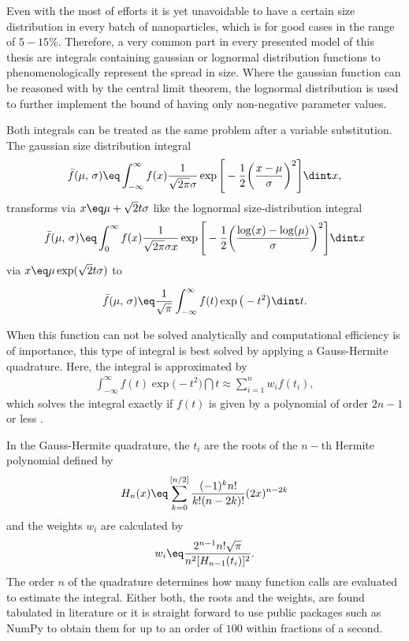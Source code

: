 \documentclass[\main/dresen_thesis.tex]{subfiles}
\begin{document}
  Even with the most of efforts it is yet unavoidable to have a certain size distribution in every batch of nanoparticles, which is for good cases in the range of $5 - 15 \%$.
  Therefore, a very common part in every presented model of this thesis are integrals containing gaussian or lognormal  distribution functions to phenomenologically represent the spread in size.
  Where the gaussian function can be reasoned with by the central limit theorem, the lognormal distribution is used to further implement the bound of having only non-negative parameter values.

  Both integrals can be treated as the same problem after a variable substitution.
  The gaussian size distribution integral
  \begin{align}
  \bar{f}(\mu,\, \sigma) \eq \int_{-\infty}^\infty f(x) \frac{1}{\sqrt{2\pi} \sigma} \exp \Bigg[- \frac{1}{2} \bigg(\frac{x-\mu}{\sigma}\bigg)^2 \Bigg] \dint x,
  \end{align}
  transforms via $x \eq \mu + \sqrt{2} t \sigma$ like the lognormal size-distribution integral
  \begin{align}
  \bar{f}(\mu,\, \sigma) \eq \int_{0}^\infty f(x) \frac{1}{\sqrt{2\pi} \sigma x} \exp \Bigg[- \frac{1}{2} \bigg(\frac{\log(x)-\log(\mu)}{\sigma}\bigg)^2 \Bigg] \dint x
  \end{align}
  via $x \eq \mu \exp(\sqrt{2} t \sigma)$ to

  \begin{align}
  \bar{f}(\mu,\,\sigma) \eq \frac{1}{\sqrt{\pi}} \int_{-\infty}^\infty f(t) \exp \big(- t^2 \big) \dint t.
  \end{align}

  When this function can not be solved analytically and computational efficiency is of importance, this type of integral is best solved by applying a Gauss-Hermite quadrature.
  Here, the integral is approximated by
  \begin{align}
  \int_{-\infty}^\infty f(t) \exp \big(- t^2 \big) \dint t \approx \sum_{i=1}^{n} w_i f(t_i),
  \end{align}
  which solves the integral exactly if $f(t)$ is given by a polynomial of order $2n-1$ or less \cite{Olver_2010_Handb}.

  In the Gauss-Hermite quadrature, the $t_{i}$ are the roots of the $n-\mathrm{th}$ Hermite polynomial defined by
  \begin{align}
  H_n (x) \eq \sum_{k=0}^{[n/2]} \frac{(-1)^k n!}{k! (n-2k)!} (2x)^{n-2k}
  \end{align}
  and the weights $w_{i}$ are calculated by
  \begin{align}
  w_i \eq \frac{2^{n-1} n! \sqrt{\pi}}{n^2 [H_{n-1}(t_i)]^2}.
  \end{align}
  The order $n$ of the quadrature determines how many function calls are evaluated to estimate the integral.
  Either both, the roots and the weights, are found tabulated in literature or it is straight forward to use public packages such as NumPy to obtain them for up to an order of $100$ \cite{Oliphant_2006_Guide} within fractions of a second.
\end{document}
